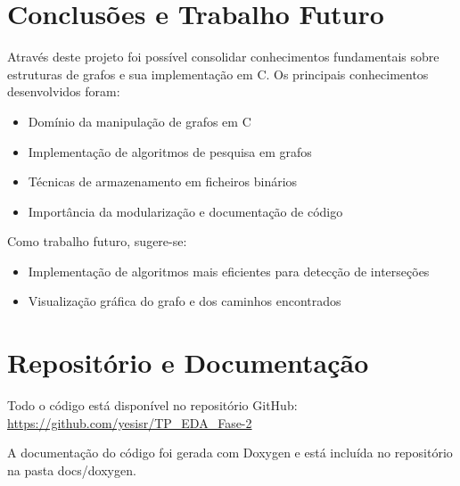 \documentclass[a4paper, 12pt]{report}
\begin{document}
\chapter{Conclusões e Trabalho Futuro}
Através deste projeto foi possível consolidar conhecimentos fundamentais sobre estruturas de grafos e sua implementação em C. Os principais conhecimentos desenvolvidos foram:
\begin{itemize}
\item Domínio da manipulação de grafos em C
\item Implementação de algoritmos de pesquisa em grafos
\item Técnicas de armazenamento em ficheiros binários
\item Importância da modularização e documentação de código
\end{itemize}

Como trabalho futuro, sugere-se:
\begin{itemize}
\item Implementação de algoritmos mais eficientes para detecção de interseções
\item Visualização gráfica do grafo e dos caminhos encontrados
\end{itemize}

\chapter{Repositório e Documentação}
Todo o código está disponível no repositório GitHub: \url{https://github.com/yesisr/TP_EDA_Fase-2}

A documentação do código foi gerada com Doxygen e está incluída no repositório na pasta docs/doxygen.
\end{document}
